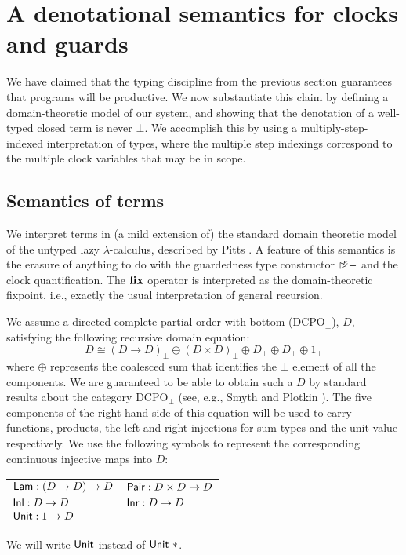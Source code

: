 \section{A denotational semantics for clocks and guards}
\label{sec:semantics}

We have claimed that the typing discipline from the previous section
guarantees that programs will be productive. We now substantiate this
claim by defining a domain-theoretic model of our system, and showing
that the denotation of a well-typed closed term is never $\bot$. We
accomplish this by using a multiply-step-indexed interpretation of
types, where the multiple step indexings correspond to the multiple
clock variables that may be in scope.

\subsection{Semantics of terms}
\label{sec:semantics-of-programs}

We interpret terms in (a mild extension of) the standard domain
theoretic model of the untyped lazy $\lambda$-calculus, described by
Pitts \cite{PittsAM:compavm}. A feature of this semantics is the
erasure of anything to do with the guardedness type constructor
$\mathord{\rhd\kern-0.4em^{\kappa}}-$ and the clock quantification. The $\textbf{fix}$ operator
is interpreted as the domain-theoretic fixpoint, i.e., exactly the
usual interpretation of general recursion.

We assume a directed complete partial order with bottom
($\mathrm{DCPO}_\bot$), $D$, satisfying the following recursive domain
equation:
\begin{displaymath}
  D \cong (D \to D)_\bot \oplus (D \times D)_\bot \oplus D_\bot \oplus D_\bot \oplus 1_\bot
\end{displaymath}
where $\oplus$ represents the coalesced sum that identifies the $\bot$
element of all the components. We are guaranteed to be able to obtain
such a $D$ by standard results about the category $\mathrm{DCPO}_\bot$
(see, e.g., Smyth and Plotkin \cite{smyth82category}). The five
components of the right hand side of this equation will be used to
carry functions, products, the left and right injections for sum types
and the unit value respectively. We use the following symbols to
represent the corresponding continuous injective maps into $D$:
\begin{center}
  \begin{tabular}{ll}
    $\mathsf{Lam} : (D \to D) \to D$ & $\mathsf{Pair} : D \times D \to D$ \\
    $\mathsf{Inl} : D \to D$ & $\mathsf{Inr} : D \to D$ \\
    $\mathsf{Unit} : 1 \to D$
  \end{tabular}  
\end{center}
We will write $\mathsf{Unit}$ instead of $\mathsf{Unit}\ *$.


